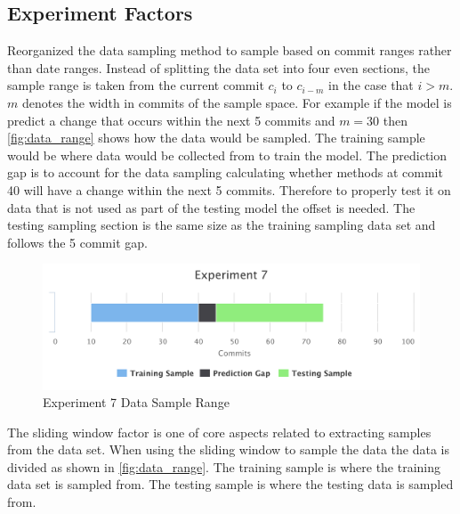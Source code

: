\subsection{Experiment Factors}


Reorganized the data sampling method to sample based on commit ranges rather than date ranges. Instead of splitting the data set into four even sections, the sample range is taken from the current commit $c_i$ to $c_{i-m}$ in the case that $i > m$. $m$ denotes the width in commits of the sample space. For example if the model is predict a change that occurs within the next 5 commits and $m = 30$ then \autoref{fig:data_range} shows how the data would be sampled. The training sample would be where data would be collected from to train the model. The prediction gap is to account for the data sampling calculating whether methods at commit 40 will have a change within the next 5 commits. Therefore to properly test it on data that is not used as part of the testing model the offset is needed. The testing sampling section is the same size as the training sampling data set and follows the 5 commit gap.

\begin{figure}[!ht]
    \centering
        \includegraphics[width=1.0\textwidth]{images/exp_7_data_range}
    \caption{Experiment 7 Data Sample Range}
    \label{fig:data_range}
\end{figure}

The sliding window factor is one of core aspects related to extracting samples from the data set. When using the sliding window to sample the data the data is divided as shown in \autoref{fig:data_range}. The training sample is where the training data set is sampled from. The testing sample is where the testing data is sampled from. 

